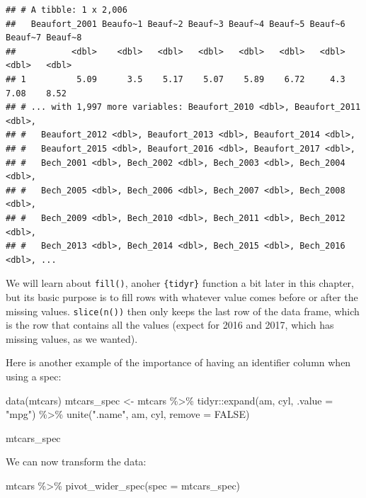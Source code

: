 \documentclass[
]{article}
\newenvironment{Shaded}{\begin{snugshade}}{\end{snugshade}}
\newcommand{\AttributeTok}[1]{\textcolor[rgb]{0.77,0.63,0.00}{#1}}
\newcommand{\ConstantTok}[1]{\textcolor[rgb]{0.00,0.00,0.00}{#1}}
\newcommand{\FunctionTok}[1]{\textcolor[rgb]{0.00,0.00,0.00}{#1}}
\newcommand{\NormalTok}[1]{#1}
\newcommand{\OtherTok}[1]{\textcolor[rgb]{0.56,0.35,0.01}{#1}}
\newcommand{\SpecialCharTok}[1]{\textcolor[rgb]{0.00,0.00,0.00}{#1}}
\newcommand{\StringTok}[1]{\textcolor[rgb]{0.31,0.60,0.02}{#1}}
\begin{document}
\begin{verbatim}
## # A tibble: 1 x 2,006
##   Beaufort_2001 Beaufo~1 Beauf~2 Beauf~3 Beauf~4 Beauf~5 Beauf~6 Beauf~7 Beauf~8
##           <dbl>    <dbl>   <dbl>   <dbl>   <dbl>   <dbl>   <dbl>   <dbl>   <dbl>
## 1          5.09      3.5    5.17    5.07    5.89    6.72     4.3    7.08    8.52
## # ... with 1,997 more variables: Beaufort_2010 <dbl>, Beaufort_2011 <dbl>,
## #   Beaufort_2012 <dbl>, Beaufort_2013 <dbl>, Beaufort_2014 <dbl>,
## #   Beaufort_2015 <dbl>, Beaufort_2016 <dbl>, Beaufort_2017 <dbl>,
## #   Bech_2001 <dbl>, Bech_2002 <dbl>, Bech_2003 <dbl>, Bech_2004 <dbl>,
## #   Bech_2005 <dbl>, Bech_2006 <dbl>, Bech_2007 <dbl>, Bech_2008 <dbl>,
## #   Bech_2009 <dbl>, Bech_2010 <dbl>, Bech_2011 <dbl>, Bech_2012 <dbl>,
## #   Bech_2013 <dbl>, Bech_2014 <dbl>, Bech_2015 <dbl>, Bech_2016 <dbl>, ...
\end{verbatim}

We will learn about \texttt{fill()}, anoher \texttt{\{tidyr\}} function a bit later in this chapter, but its basic
purpose is to fill rows with whatever value comes before or after the missing values. \texttt{slice(n())}
then only keeps the last row of the data frame, which is the row that contains all the values (expect
for 2016 and 2017, which has missing values, as we wanted).

Here is another example of the importance of having an identifier column when using a spec:

\begin{Shaded}
\begin{Highlighting}[]
\FunctionTok{data}\NormalTok{(mtcars)}
\NormalTok{mtcars\_spec }\OtherTok{\textless{}{-}}\NormalTok{ mtcars }\SpecialCharTok{\%\textgreater{}\%} 
\NormalTok{    tidyr}\SpecialCharTok{::}\FunctionTok{expand}\NormalTok{(am, cyl, }\AttributeTok{.value =} \StringTok{"mpg"}\NormalTok{) }\SpecialCharTok{\%\textgreater{}\%}
    \FunctionTok{unite}\NormalTok{(}\StringTok{".name"}\NormalTok{, am, cyl, }\AttributeTok{remove =} \ConstantTok{FALSE}\NormalTok{)}

\NormalTok{mtcars\_spec}
\end{Highlighting}
\end{Shaded}

We can now transform the data:

\begin{Shaded}
\begin{Highlighting}[]
\NormalTok{mtcars }\SpecialCharTok{\%\textgreater{}\%} 
    \FunctionTok{pivot\_wider\_spec}\NormalTok{(}\AttributeTok{spec =}\NormalTok{ mtcars\_spec)}
\end{Highlighting}
\end{Shaded}
\end{document}
